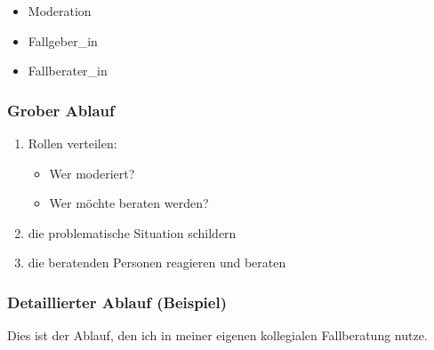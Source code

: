 \begin{itemize}
  \item Moderation
  \item Fallgeber\_in
  \item Fallberater\_in
\end{itemize}


\subsubsection{Grober Ablauf}

\begin{enumerate}
  \item Rollen verteilen:
    \begin{itemize}
      \item Wer moderiert?
      \item Wer möchte beraten werden?
    \end{itemize}
  \item die problematische Situation schildern
  \item die beratenden Personen reagieren und beraten
\end{enumerate}


\subsubsection{Detaillierter Ablauf (Beispiel)}

Dies ist der Ablauf, den ich in meiner eigenen kollegialen Fallberatung nutze.


